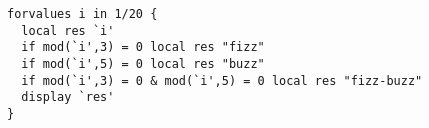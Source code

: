 \documentclass{article}
\begin{document}
  \begin{verbatim}
forvalues i in 1/20 {
  local res `i'
  if mod(`i',3) = 0 local res "fizz"  
  if mod(`i',5) = 0 local res "buzz"  
  if mod(`i',3) = 0 & mod(`i',5) = 0 local res "fizz-buzz"
  display `res'
}
  \end{verbatim}
\end{document}
